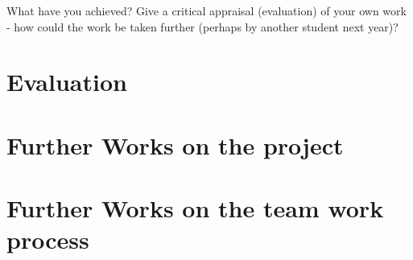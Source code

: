 What have you achieved? Give a critical appraisal (evaluation) of your own work - how could the work be taken further (perhaps by another student next year)?

\section{Evaluation}
\section{Further Works on the project}
\section{Further Works on the team work process}